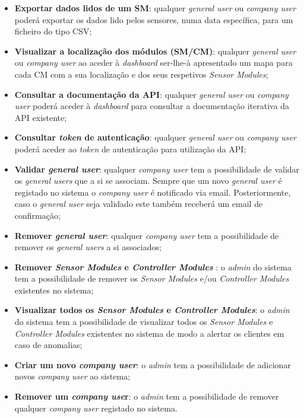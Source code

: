 \begin{itemize}
	\item \textbf{Exportar dados lidos de um \acl{SM}}: qualquer \textit{general user} ou \textit{company user} poderá exportar os dados lido pelos sensores, numa data específica, para um ficheiro do tipo \ac{CSV}; 
	
	\item \textbf{Visualizar a localização dos módulos (\acl{SM}/\acl{CM})}: qualquer \textit{general user} ou \textit{company user} ao aceder à \textit{dashboard} ser-lhe-à apresentado um mapa para cada \acl{CM} com a sua localização e dos seus respetivos \textit{Sensor Modules}; 
	
	
	\item \textbf{Consultar a documentação da API}: qualquer \textit{general user} ou \textit{company user} poderá aceder à \textit{dashboard} para consultar a documentação iterativa da \ac{API} existente; 
		
	\item \textbf{Consultar \textit{token} de autenticação}: qualquer \textit{general user} ou \textit{company user} poderá aceder ao \textit{token} de autenticação para utilização da \ac{API}; 
	

	
	\item \textbf{Validar \textit{general user}}: qualquer \textit{company user} tem a possibilidade de validar os \textit{general users} que a si se associam. Sempre que um novo \textit{general user} é registado no sistema o \textit{company user} é notificado via email. Posteriormente, caso o \textit{general user} seja validado este também receberá um email de confirmação;  
	
	\item \textbf{Remover \textit{general user}}: qualquer \textit{company user} tem a possibilidade de remover os \textit{general users} a si associados; 
	
	
	\item \textbf{Remover \textit{Sensor Modules} e \textit{Controller Modules} }: o \textit{admin} do sistema tem a possibilidade de remover os \textit{Sensor Modules} e/ou \textit{Controller Modules} existentes no sistema; 
	
	
	\item \textbf{Visualizar todos os \textit{Sensor Modules} e \textit{Controller Modules}}: o \textit{admin} do sistema tem a possibilidade de visualizar todos os \textit{Sensor Modules} e \textit{Controller Modules} existentes no sistema de modo a alertar os clientes em caso de anomalias;
	
	
	\item \textbf{Criar um novo \textit{company user}}: o \textit{admin} tem a possibilidade de adicionar novos \textit{company user} ao sistema; 
	
	\item \textbf{Remover um \textit{company use}r}: o \textit{admin} tem a possibilidade de remover qualquer \textit{company user} registado no sistema.
	
	
\end{itemize}









